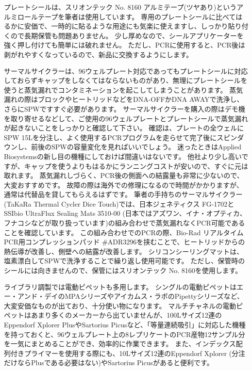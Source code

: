 \documentclass[titlepage,10pt,a4paper,uplatex]{jsbook}
\begin{document}
プレートシールは、スリオンテック No. 8160 アルミテープ(ツヤあり)というアルミロールテープを筆者は使用しています。
専用のプレートシールに比べてはるかに安価で、一時的に貼るような用途にも気楽に使えますし、しっかり貼り付くので長期保管も問題ありません。
少し厚めなので、シールアプリケーターを強く押し付けても簡単には破れません。
ただし、PCRに使用すると、PCR後は剥がれやすくなっているので、新品に交換するようにします。

サーマルサイクラーは、96ウェルプレート対応であってもプレートシールに対応しておらずキャップをしなくてはならないものがあり、無理にプレートシールを使うと蒸気漏れでコンタミネーションを起こしてしまうことがあります。
蒸気漏れの際はブロックやヒートリッドなどをDNA-OFFかDNA AWAYで洗浄し、さらにSPWですすぐ必要があります。
サーマルサイクラーを購入の際はデモ機を取り寄せるなどして、ご使用の96ウェルプレートとプレートシールで蒸気漏れが起きないことをしっかりと確認して下さい。
確認は、プレートの全ウェルにSPW 15{\textmu}Lを分注し、よく使用するPCRプログラムを走らせて完了後にスピンダウンし、前後のSPWの容量変化を見ればいいでしょう。
迷ったときはApplied Biosystemsの新し目の機種にしておけば間違いはないです。
他社より少し高いですが、キャップを使うよりもはるかにランニングコストが安いので、すぐに元は取れます。
蒸気漏れしづらく、PCR後の側面への結露量も非常に少ないので、大変おすすめです。
故障の際は海外での修理になるので時間がかかりますが、通常は代替品を貸してもらえるはずです。
筆者の手持ちのサーマルサイクラー(TaKaRa Thermal Cycler Dice Touch)では、日本ジェネティクス FG-1702とSSIbio UltraFlux Sealing Mats 3510-00 (日本ではアズワン、イナ・オプティカ、フナコシなどが取り扱っています)の組み合わせで蒸気漏れなくPCR可能であることを確認しています。
この組み合わせでのPCRの際、Bio-Rad リアルタイムPCR用コンプレッションパッド \#ADR3296を挟むことで、ヒートリッドからの熱伝導が改善し、側壁への結露が改善します。
シリコンシーリングマットは、塩素漂白してSPWで洗浄することで繰り返し使用可能です。
ただし、保管時のシールには向きませんので、保管にはスリオンテック No. 8160を使用します。

ライブラリ調製では電動ピペットも多用します。
シングルの電動ピペットはエー・アンド・デイのMPAシリーズやアイカムス・ラボのPipettyシリーズなど、大変安価なものが出ており、十分使い物になります。
マルチチャネルの電動ピペットはあまり多くのメーカーから出ていませんが、100{\textmu}Lサイズ12連のEppendorf Xplorer PlusやSartorius Picusなど、「等量連続吸引」に対応した機種を持っておくと、96ウェルプレート上の8レプリケートのPCR産物12サンプル分を一気にまとめることができ、効率的に作業できます。
また、インデックス配列付きプライマーを使用する際にも、10{\textmu}Lサイズ12連のEppendorf Xplorer (分注だけならPlusである必要はない)やSartorius Picusがあると便利です。
\end{document}

